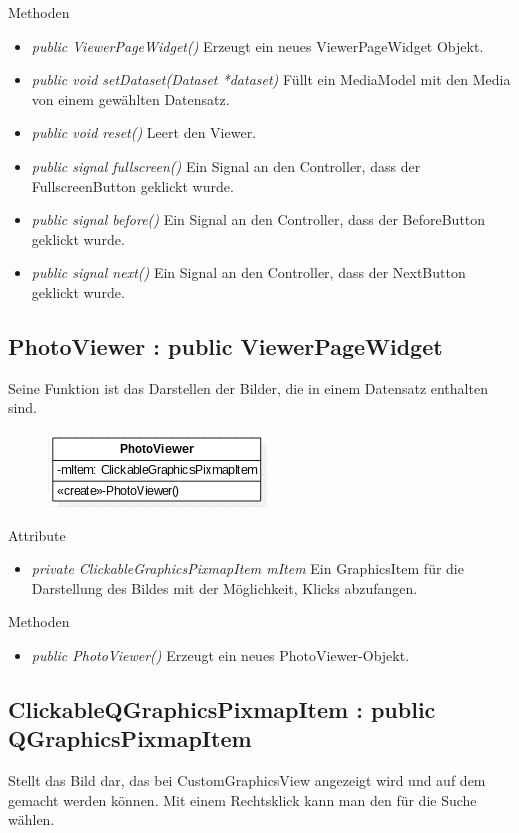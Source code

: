 \pagebreak
Methoden
\begin{itemize}
	\item\textit{public ViewerPageWidget()} 
	Erzeugt ein neues ViewerPageWidget Objekt.
	\item\textit{public void setDataset(Dataset *dataset)} 
	Füllt ein MediaModel mit den Media von einem gewählten Datensatz.
	\item\textit{public void reset()} 
	Leert den Viewer.
	\item\textit{public signal fullscreen()} 
	Ein Signal an den Controller, dass der FullscreenButton geklickt wurde.
	\item\textit{public signal before()} 
	Ein Signal an den Controller, dass der BeforeButton geklickt wurde.
	\item\textit{public signal next()}
	Ein Signal an den Controller, dass der NextButton geklickt wurde.
\end{itemize}

\subsection*{PhotoViewer : public ViewerPageWidget}
Seine Funktion ist das Darstellen der Bilder, die in einem Datensatz enthalten sind.

\begin{figure}[H]
	\centering
	\includegraphics[scale=0.5]{img/Klassendiagramm/Klassen/View/PhotoViewer}
	\label{fig:photoVIewer}
\end{figure}

Attribute
\begin{itemize}
	\item\textit{private ClickableGraphicsPixmapItem mItem} 
	Ein GraphicsItem für die Darstellung des Bildes mit der Möglichkeit, Klicks abzufangen.    
\end{itemize}

Methoden
\begin{itemize}
	\item\textit{public PhotoViewer()}
	 Erzeugt ein neues PhotoViewer-Objekt.
\end{itemize}

\subsection*{ClickableQGraphicsPixmapItem : public QGraphicsPixmapItem}
Stellt das Bild dar, das bei CustomGraphicsView angezeigt wird und auf dem  gemacht werden können. Mit einem Rechtsklick kann man den  für die Suche wählen.

